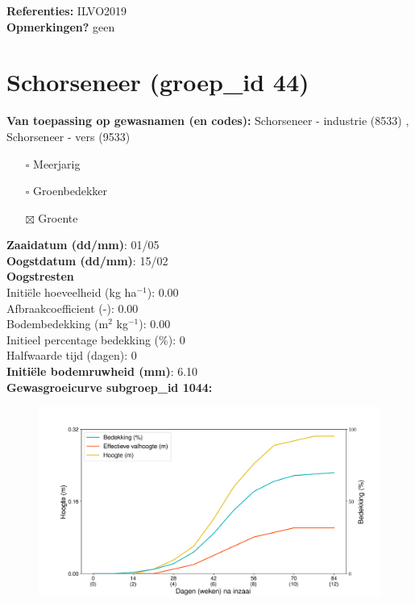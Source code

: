 \documentclass{article}
\begin{document}
  \textbf{Referenties:} ILVO2019 \vspace{0.10cm} \\ 
  \textbf{Opmerkingen?} geen \vspace{0.10cm} \\ 
 \newpage 
 \section{Schorseneer (groep\_id 44)} 
 \textbf{Van toepassing op gewasnamen (en codes):} Schorseneer - industrie (8533) , Schorseneer - vers (9533) 
 \begin{multicols}{3} \begin{itemize} \item[$\square$] Meerjarig \item[$\square$] Groenbedekker \item[$\boxtimes$] Groente \end{itemize} \end{multicols} 
  \textbf{Zaaidatum (dd/mm)}: 01/05  \vspace{0.10cm} \\ 
  \textbf{Oogstdatum (dd/mm)}: 15/02  \vspace{0.10cm} \\ 
  \textbf{Oogstresten} \vspace{0.05cm} \\ 
  \tab Initi\"{e}le hoeveelheid (kg ha$^{-1}$): 0.00 \vspace{0.05cm} \\ 
  \tab Afbraakcoefficient (-): 0.00 \vspace{0.05cm} \\ 
  \tab Bodembedekking (m$^2$ kg$^{-1}$): 0.00 \vspace{0.05cm} \\ 
  \tab Initieel percentage bedekking (\%): 0 \vspace{0.05cm} \\ 
  \tab Halfwaarde tijd (dagen): 0 \vspace{0.05cm} \\ 
  \textbf{Initi\"{e}le bodemruwheid (mm)}: 6.10 \vspace{0.05cm} \\ 
  \textbf{Gewasgroeicurve subgroep\_id 1044:} 
 \begin{center} \begin{figure}[H] \includegraphics[width=12.5cm]{temp/1044.png} \end{figure} \end{center} 
\end{document}

